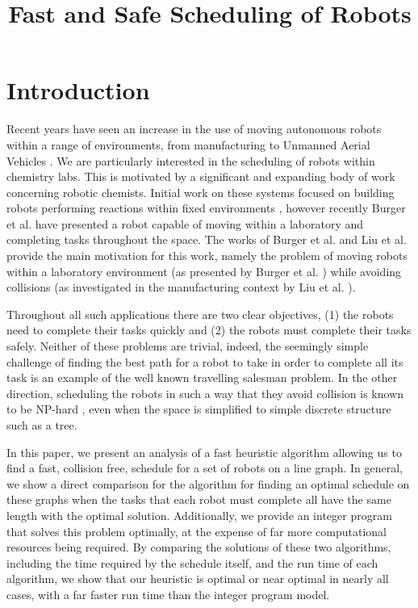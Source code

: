\documentclass{DAC}
\title{Fast and Safe Scheduling of Robots}
\author{}
\begin{document}
\maketitle

\section{Introduction}

Recent years have seen an increase in the use of moving autonomous robots within a range of environments, from manufacturing \cite{Liu2023} to Unmanned Aerial Vehicles \cite{qamar2023trmaxalloc}. We are particularly interested in the scheduling of robots within chemistry labs. This is motivated by a significant and expanding body of work concerning robotic chemists. Initial work on these systems focused on building robots performing reactions within fixed environments \cite{granda2018controlling,king2011rise,langner2019ternary,li2015synthesis,macleod2020selfdriving}, however recently Burger et al. \cite{burger2020mobile} have presented a robot capable of moving within a laboratory and completing tasks throughout the space. The works of Burger et al. \cite{burger2020mobile} and Liu et al. \cite{Liu2023} provide the main motivation for this work, namely the problem of moving robots within a laboratory environment (as presented by Burger et al. \cite{burger2020mobile}) while avoiding collisions (as investigated in the manufacturing context by Liu et al. \cite{Liu2023}).

Throughout all such applications there are two clear objectives, (1) the robots need to complete their tasks quickly and (2) the robots must complete their tasks safely. Neither of these problems are trivial, indeed, the seemingly simple challenge of finding the best path for a robot to take in order to complete all its task is an example of the well known travelling salesman problem. In the other direction, scheduling the robots in such a way that they avoid collision is known to be NP-hard \cite{ourPreviousPaper}, even when the space is simplified to simple discrete structure such as a tree.

In this paper, we present an analysis of a fast heuristic algorithm allowing us to find a fast, collision free, schedule for a set of robots on a line graph. In general, we show a direct comparison for the algorithm for finding an optimal schedule on these graphs when the tasks that each robot must complete all have the same length with the optimal solution. Additionally, we provide an integer program that solves this problem optimally, at the expense of far more computational resources being required. By comparing the solutions of these two algorithms, including the time required by the schedule itself, and the run time of each algorithm, we show that our heuristic is optimal or near optimal in nearly all cases, with a far faster run time than the integer program model.\looseness
\end{document}

